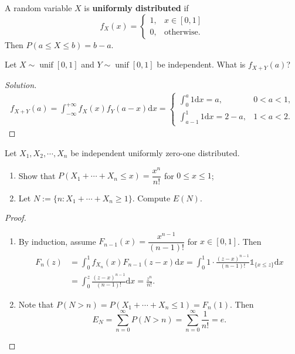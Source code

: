 \documentclass[11pt,singlecolumn, openany, citestyle=authoryear]{elegantbook}
\begin{document}
\begin{CJK}{UTF8}{gbsn}
\begin{example}
    A random variable $X$ is \textbf{uniformly distributed} if 
    $$
    f_X(x) = 
    \begin{cases}
        1, & x\in[0,1]\\
        0, &\text{otherwise}.
    \end{cases}
    $$
    Then $P(a\leqslant X \leqslant b)=b-a$.
\end{example}

\begin{example}
    Let $X\sim \operatorname{unif}[0,1]$ and $Y \sim \operatorname{unif}[0,1]$ be independent.
    What is $f_{X+Y}(a)$?
\end{example}
\begin{proof}[Solution]
    \begin{align*}
        f_{X+Y}(a) = \int_{-\infty}^{+\infty} f_X(x)f_Y(a-x)\mathrm{d}x=
        \begin{cases}
            \displaystyle \int_0^a 1 \mathrm{d}x = a, & 0<a<1,\\
            \displaystyle \int_{a-1}^1 1 \mathrm{d}x = 2-a, & 1<a<2.
        \end{cases}
    \end{align*}
\end{proof}

\begin{example}
    Let $X_1,X_2,\cdots,X_n$ be independent uniformly zero-one distributed.
    \begin{enumerate}
        \item Show that $P(X_1+\cdots+X_n\leqslant x)=\dfrac{x^n}{n!}$ for $0\leqslant x\leqslant 1$;
        \item Let $N:=\{n:X_1+\cdots+X_n\geqslant 1\}$. Compute $E(N)$.
    \end{enumerate} 
\end{example}
\begin{proof}
    \begin{enumerate}
        \item By induction, assume $F_{n-1}(x)=\dfrac{x^{n-1}}{(n-1)!}$ for $x\in[0,1]$.
        Then 
        \begin{align*}
            F_n(z)&=\int_0^1 f_{X_n}(x) F_{n-1}(z-x)\mathrm{d}x = \int_0^1 1\cdot 
            \frac{(z-x)^{n-1}}{(n-1)!}\mathds{1}_{\{x\leqslant z\}}\mathrm{d}x\\
            &= \int_{0}^{z}\frac{(z-x)^{n-1}}{(n-1)!}\mathrm{d}x=\frac{z^n}{n!}.
        \end{align*}
        \item Note that 
        $P(N>n)=P(X_1+\cdots+X_n\leqslant 1)=F_n(1)$. Then 
        $$
        E_N = \sum_{n=0}^\infty P(N>n)=\sum_{n=0}^\infty \frac{1}{n!}=e.
        $$
    \end{enumerate}
\end{proof}


\end{CJK}
\end{document}
